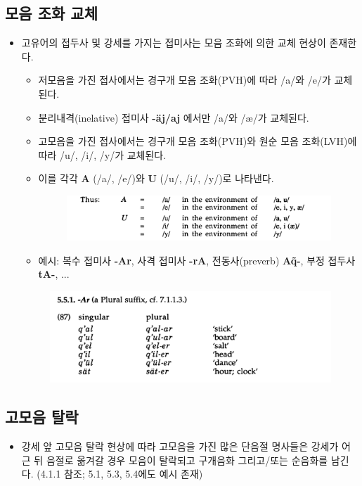\subsection{모음 조화 교체}
\begin{itemize}
\item 고유어의 접두사 및 강세를 가지는 접미사는 모음 조화에 의한 교체 현상이 존재한다. 
\begin{itemize}
\item 저모음을 가진 접사에서는 경구개 모음 조화(PVH)에 따라 /a/와 /e/가 교체된다. 
\item 분리내격(inelative) 접미사 \textbf{-äj/aj} 에서만 /a/와 /æ/가 교체된다. 
\item 고모음을 가진 접사에서는 경구개 모음 조화(PVH)와 원순 모음 조화(LVH)에 따라 /u/, /i/, /y/가 교체된다.
\item 이를 각각 \textbf{A} (/a/, /e/)와 \textbf{U} (/u/, /i/, /y/)로 나타낸다.
\begin{figure}[H]
\centerline{\includegraphics[width=.8\linewidth]{Lezgian/src/vh.png}}
\end{figure}
\item 예시: 복수 접미사 \textbf{-Ar}, 사격 접미사 \textbf{-rA}, 전동사(preverb) \textbf{A\~q-}, 부정 접두사 \textbf{tA-}, ...
\end{itemize}
\begin{figure}[H]
\centerline{\includegraphics[width=.8\linewidth]{Lezgian/src/ex87.png}}
\end{figure}
\end{itemize}
 
\subsection{고모음 탈락}
\begin{itemize}
\item 강세 앞 고모음 탈락 현상에 따라 고모음을 가진 많은 단음절 명사들은 강세가 어근 뒤 음절로 옮겨갈 경우 모음이 탈락되고 구개음화 그리고/또는 순음화를 남긴다. (4.1.1 참조; 5.1, 5.3, 5.4에도 예시 존재)
\end{itemize}

